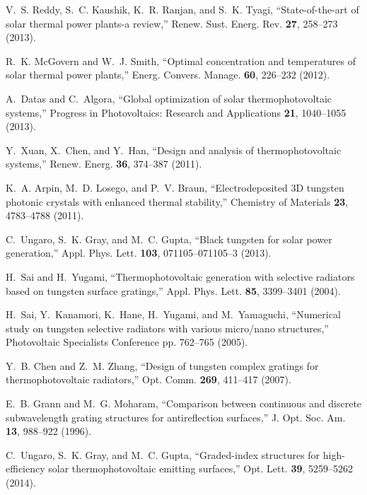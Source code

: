 \documentclass[10pt,letterpaper]{article}
\begin{document}
\begin{thebibliography}{100}
V.~S. Reddy, S.~C. Kaushik, K.~R. Ranjan, and S.~K. Tyagi,
  \enquote{State-of-the-art of solar thermal power plants-a review,} Renew.
  Sust. Energ. Rev. \textbf{27}, 258--273 (2013).

R.~K. McGovern and W.~J. Smith, \enquote{Optimal concentration and temperatures
  of solar thermal power plants,} Energ. Convers. Manage. \textbf{60}, 226--232
  (2012).

A.~Datas and C.~Algora, \enquote{Global optimization of solar
  thermophotovoltaic systems,} Progress in Photovoltaics: Research and
  Applications \textbf{21}, 1040--1055 (2013).

Y.~Xuan, X.~Chen, and Y.~Han, \enquote{Design and analysis of
  thermophotovoltaic systems,} Renew. Energ. \textbf{36}, 374--387 (2011).

K.~A. Arpin, M.~D. Losego, and P.~V. Braun, \enquote{{Electrodeposited 3D
  tungsten photonic crystals with enhanced thermal stability},} Chemistry of
  Materials \textbf{23}, 4783--4788 (2011).

C.~Ungaro, S.~K. Gray, and M.~C. Gupta, \enquote{Black tungsten for solar power
  generation,} Appl. Phys. Lett. \textbf{103}, 071105--071105--3 (2013).

H.~Sai and H.~Yugami, \enquote{Thermophotovoltaic generation with selective
  radiators based on tungsten surface gratings,} Appl. Phys. Lett. \textbf{85},
  3399--3401 (2004).

H.~Sai, Y.~Kanamori, K.~Hane, H.~Yugami, and M.~Yamaguchi, \enquote{Numerical
  study on tungsten selective radiators with various micro/nano structures,}
  Photovoltaic Specialists Conference pp. 762--765 (2005).

Y.~B. Chen and Z.~M. Zhang, \enquote{Design of tungsten complex gratings for
  thermophotovoltaic radiators,} Opt. Comm. \textbf{269}, 411--417 (2007).

E.~B. Grann and M.~G. Moharam, \enquote{Comparison between continuous and
  discrete subwavelength grating structures for antireflection surfaces,} J.
  Opt. Soc. Am. \textbf{13}, 988--922 (1996).

C.~Ungaro, S.~K. Gray, and M.~C. Gupta, \enquote{Graded-index structures for
  high-efficiency solar thermophotovoltaic emitting surfaces,} Opt. Lett.
  \textbf{39}, 5259--5262 (2014).


\end{thebibliography}
\end{document}
